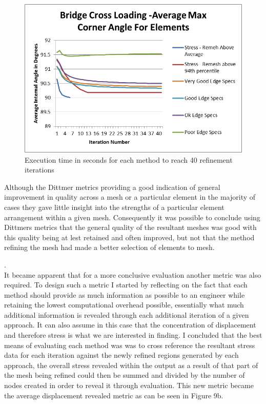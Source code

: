 \begin{figure}[!h]
  \centerline{\includegraphics[width=125mm, scale=1]{../Graphics/Graphs/BridgeCrossLoadingAverageMaxCornerAngleForElements.png}}
  \caption{Execution time in seconds for each method to reach 40 refinement iterations}
  \label{fig:sub1}
\end{figure}

Although the Dittmer metrics providing a good indication of general improvement in quality across a mesh or a particular element in the majority of cases they gave little insight into the strengths of a particular element arrangement within a given mesh. Consequently it was possible to conclude using Dittmers metrics that the general quality of the resultant meshes was good with this quality being at lest retained and often improved, but not that the method refining the mesh had made a better selection of elements to mesh. 

\cite{ElemQualAndChecks}. \\


\noindent
It became apparent that for a more conclusive evaluation another metric was also required. To design such a metric I started by reflecting on the fact that each method should provide as much information as possible to an engineer while retaining the lowest computational overhead possible, essentially what much additional information is revealed through each additional iteration of a given approach. It can also assume in this case that the concentration of displacement and therefore stress is what we are interested in finding. I concluded that the best means of evaluating each method was was to cross reference the resultant stress data for each iteration against the newly refined regions generated by each approach, the overall stress revealed within the output as a result of that part of the mesh being refined could then be summed and divided by the number of nodes created in order to reveal it through evaluation. This new metric became the average displacement revealed metric as can be seen in Figure 9b.




